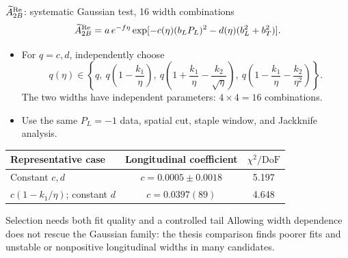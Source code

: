 \begin{frame}{$\widetilde{A}_{2B}^{\text{Re}}$: systematic Gaussian test, 16 width combinations}
\[
\widetilde{A}_{2B}^{\text{Re}}=a\,e^{-f\eta}\exp[-c(\eta)(b_LP_L)^2-d(\eta)(b_L^2+b_T^2)].
\]
\begin{itemize}
\item For $q=c,d$, independently choose
\[
q(\eta)\in\left\{q,\ q\left(1-\frac{k_1}{\eta}\right),\ q\left(1+\frac{k_1}{\eta}-\frac{k_2}{\sqrt\eta}\right),\ q\left(1-\frac{k_1}{\eta}-\frac{k_2}{\eta^2}\right)\right\}.
\]
The two widths have independent parameters: $4\times4=16$ combinations.
\item Use the same $P_L=-1$ data, spatial cut, staple window, and Jackknife analysis.
\end{itemize}
\small\centering
\begin{tabular}{lcc}
\toprule Representative case & Longitudinal coefficient & $\chi^2/\mathrm{DoF}$ \\
\midrule Constant $c,d$ & $c=0.0005\pm0.0018$ & 5.197 \\
$c(1-k_1/\eta)$; constant $d$ & $c=0.0397(89)$ & 4.648 \\
\bottomrule\end{tabular}
\medskip
\begin{block}{Selection needs both fit quality and a controlled tail}
Allowing width dependence does not rescue the Gaussian family: the thesis comparison finds poorer fits and unstable or nonpositive longitudinal widths in many candidates.
\end{block}
\end{frame}

